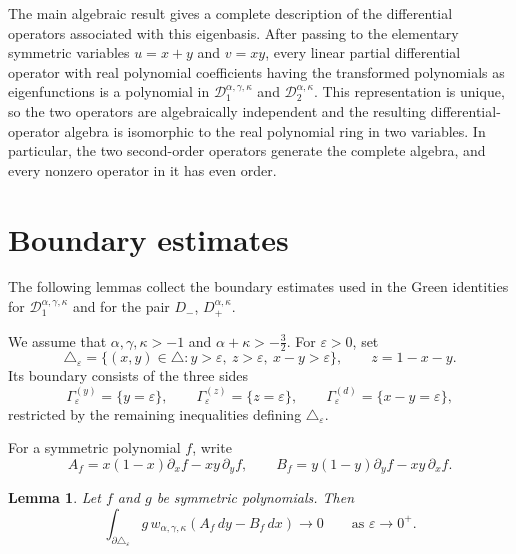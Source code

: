 \documentclass[reqno,10pt]{amsart}
\theoremstyle{plain}
\newtheorem{lemma}[theorem]{Lemma}
\numberwithin{equation}{section}
\numberwithin{figure}{section}
\begin{document}
The main algebraic result gives a complete description of the differential
operators associated with this eigenbasis. After passing to the elementary
symmetric variables \(u=x+y\) and \(v=xy\), every linear partial differential
operator with real polynomial coefficients having the transformed polynomials as
eigenfunctions is a polynomial in
\(\mathcal D_1^{\alpha,\gamma,\kappa}\) and
\(\mathcal D_2^{\alpha,\kappa}\). This representation is unique, so the two
operators are algebraically independent and the resulting differential-operator
algebra is isomorphic to the real polynomial ring in two variables. In particular,
the two second-order operators generate the complete algebra, and every nonzero
operator in it has even order.

\appendix

\section{Boundary estimates}\label{app:boundary-estimates}

The following lemmas collect the boundary estimates used in the Green
identities for
\(\mathcal D_1^{\alpha,\gamma,\kappa}\) and for the pair
\(D_-\), \(D_+^{\alpha,\kappa}\).

We assume that $\alpha,\gamma,\kappa>-1$ and $\alpha+\kappa>-\frac32$. For \(\varepsilon>0\), set
\[
\triangle_\varepsilon
=
\{(x,y)\in\triangle:
  y>\varepsilon,\ 
  z>\varepsilon,\ 
  x-y>\varepsilon\},
\qquad
z=1-x-y.
\]
Its boundary consists of the three sides
\[
\Gamma_\varepsilon^{(y)}
=
\{y=\varepsilon\},
\qquad
\Gamma_\varepsilon^{(z)}
=
\{z=\varepsilon\},
\qquad
\Gamma_\varepsilon^{(d)}
=
\{x-y=\varepsilon\},
\]
restricted by the remaining inequalities defining
\(\triangle_\varepsilon\).

For a symmetric polynomial \(f\), write
\[
A_f
=
x(1-x)\partial_xf-xy\,\partial_yf,
\qquad
B_f
=
y(1-y)\partial_yf-xy\,\partial_xf.
\]

\begin{lemma}\label{lem:D1-boundary-estimates}
Let \(f\) and \(g\) be symmetric polynomials. Then
\[
\int_{\partial\triangle_\varepsilon}
g\,w_{\alpha,\gamma,\kappa}
\left(A_f\,dy-B_f\,dx\right)
\longrightarrow0
\qquad
\text{as }\varepsilon\to0^+.
\]
\end{lemma}
\end{document}
